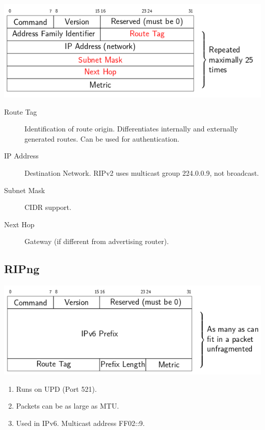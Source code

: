 \documentclass{article}
\begin{document}
\centerline{\includegraphics[scale=0.5]{images/RIPv2.png}\\[1cm]}

\begin{description}
	\item[Route Tag] Identification of route origin. Differentiates internally and externally generated routes. Can be used for authentication.
	\item[IP Address] Destination Network. RIPv2 uses multicast group 224.0.0.9, not broadcast.
	\item[Subnet Mask] CIDR support.
	\item[Next Hop] Gateway (if different from advertising router).
\end{description}



\subsection{RIPng}


\centerline{\includegraphics[scale=0.5]{images/RIPng.png}\\[1cm]}


\begin{enumerate}
	\item Runs on UPD (Port 521).
	\item Packets can be as large as MTU.
	\item Used in IPv6. Multicast address FF02::9.
\end{enumerate}
\end{document}
